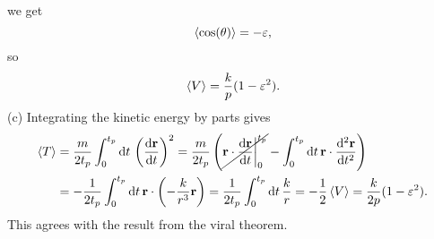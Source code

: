 \documentclass{article}
\begin{document}
        we get
        \begin{equation*}
            \expval{\cos(\theta)} = - \varepsilon,
        \end{equation*}
        so
        \begin{equation*}
            \expval{V} = \frac{k}{p}(1 - \varepsilon^2).
        \end{equation*}
        (c) Integrating the  kinetic energy by parts gives 
        \begin{align*}
            \expval{T} & = \frac{m}{2 t_p}   \int_0^{t_p} \dd t \, \left(\dv{\mathbf{r}}{t}\right)^2 
            = \frac{m}{2 t_p} \left(\cancel{\mathbf{r} \cdot \dv{\mathbf{r}}{t}\bigg|_0^{t_p} } -   \int_0^{t_p} \dd t \, \mathbf{r} \cdot\dv[2]{\mathbf{r}}{t}\right) \\
            &  = - \frac{1}{2 t_p} \int_0^{t_p} \dd t \, \mathbf{r} \cdot \left(- \frac{k}{r^3} \mathbf{r}\right) = \frac{1}{2 t_p} \int_0^{t_p} \dd t \, \frac{k}{r} = - \frac{1}{2} \expval{V} = \frac{k}{2p}(1 - \varepsilon^2).
        \end{align*}
        This agrees with the result from the viral theorem.
\end{document}
